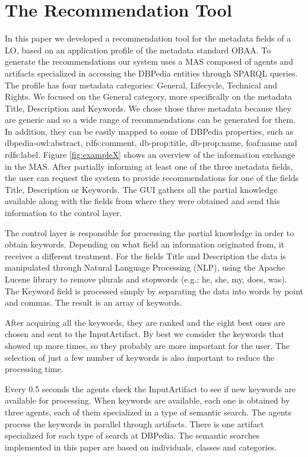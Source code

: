 \documentclass[a4paper,twoside]{article}
\begin{document}
\section{The Recommendation Tool}

\noindent In this paper we developed a recommendation tool for the metadata fields of a LO, based on an application profile of the metadata standard OBAA. To generate the recommendations our system uses a MAS composed of agents and artifacts specialized in accessing the DBPedia entities through SPARQL queries. The profile has four metadata categories: General, Lifecycle, Technical and Rights. We focused on the General category, more specifically on the metadata Title, Description and Keywords. We chose those three metadata because they are generic and so a wide range of recommendations can be generated for them. In addition, they can be easily mapped to some of DBPedia properties, such as dbpedia-owl:abstract,  rdfs:comment, db-prop:title, db-prop:name, foaf:name and rdfs:label.
Figure \ref{fig:exampleX} shows an overview of the information exchange in the MAS. After partially informing at least one of the three metadata fields, the user can request the system to provide recommendations for one of the fields Title, Description or Keywords. The GUI gathers all the partial knowledge available along with the fields from where they were obtained and send this information to the control layer.

The control layer is responsible for processing the partial knowledge in order to obtain keywords. Depending on what field an information originated from, it receives a different treatment. For the fields Title and Description the data is manipulated through Natural Language Processing (NLP), using the Apache Lucene library to remove plurals and stopwords (e.g.: he, she, my, does, was). The Keyword field is processed simply by separating the data into words by point and commas. The result is an array of keywords.

After acquiring all the keywords, they are ranked and the eight best ones are chosen and sent to the InputArtifact. By best we consider the keywords that showed up more times, so they probably are more important for the user. The selection of just a few number of keywords is also important to reduce the processing time.

Every 0.5 seconds the agents check the InputArtifact to see if new keywords are available for processing. When keywords are available, each one is obtained by three agents, each of them specialized in a type of semantic search. The agents process the keywords in parallel through artifacts. There is one artifact specialized for each type of search at DBPedia. The semantic searches implemented in this paper are based on individuals, classes and categories.
\end{document}

